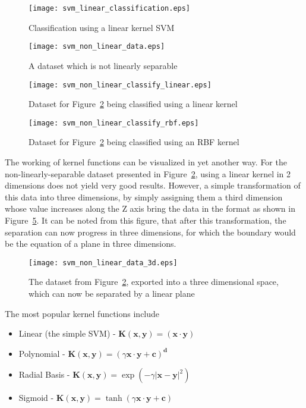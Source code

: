 \begin{figure}[t!]
    \centering
    \texttt{[image: svm\_linear\_classification.eps]}
    \caption{Classification using a linear kernel SVM}
    \label{fig:svm_linear_classify}
\end{figure}

\begin{figure}[t!]
    \centering
    \texttt{[image: svm\_non\_linear\_data.eps]}
    \caption{A dataset which is not linearly separable}
    \label{fig:svm_non_linear_data}
\end{figure}

\begin{figure}[t!]
    \centering
    \texttt{[image: svm\_non\_linear\_classify\_linear.eps]}
    \caption{Dataset for Figure~\ref{fig:svm_non_linear_data} being classified using a linear kernel}
    \label{fig:svm_non_linear_classify_linear}
\end{figure}

\begin{figure}[t!]
    \centering
    \texttt{[image: svm\_non\_linear\_classify\_rbf.eps]}
    \caption{Dataset for Figure~\ref{fig:svm_non_linear_data} being classified using an RBF kernel}
    \label{fig:svm_non_linear_classify_rbf}
\end{figure}

The working of kernel functions can be visualized in yet another way. For the non-linearly-separable dataset presented in Figure~\ref{fig:svm_non_linear_data}, using a linear kernel in 2 dimensions does not yield very good results. However, a simple transformation of this data into three dimensions, by simply assigning them a third dimension whose value increases along the Z axis bring the data in the format as shown in Figure~\ref{fig:svm_non_linear_data_3d}. It can be noted from this figure, that after this transformation, the separation can now progress in three dimensions, for which the boundary would be the equation of a plane in three dimensions.

\begin{figure}[t!]
    \centering
    \texttt{[image: svm\_non\_linear\_data\_3d.eps]}
    \caption{The dataset from Figure~\ref{fig:svm_non_linear_data}, exported into a three dimensional space, which can now be separated by a linear plane}
    \label{fig:svm_non_linear_data_3d}
\end{figure}

The most popular kernel functions include
\begin{itemize}
    \item{Linear (the simple SVM) - $\mathbf{K(x, y)} = (\mathbf{x} \cdot \mathbf{y})$ }
    \item{Polynomial - $\mathbf{K(x, y)} = (\gamma \mathbf{x} \cdot \mathbf{y} + \mathbf{c})^{\mathbf{d}}$}
    \item{Radial Basis - $\mathbf{K(x, y)} = \exp(-\gamma {| \mathbf{x} - \mathbf{y} |}^{2})$}
    \item{Sigmoid - $\mathbf{K(x, y)} = \tanh(\gamma \mathbf{x} \cdot \mathbf{y} + \mathbf{c})$}
\end{itemize}
